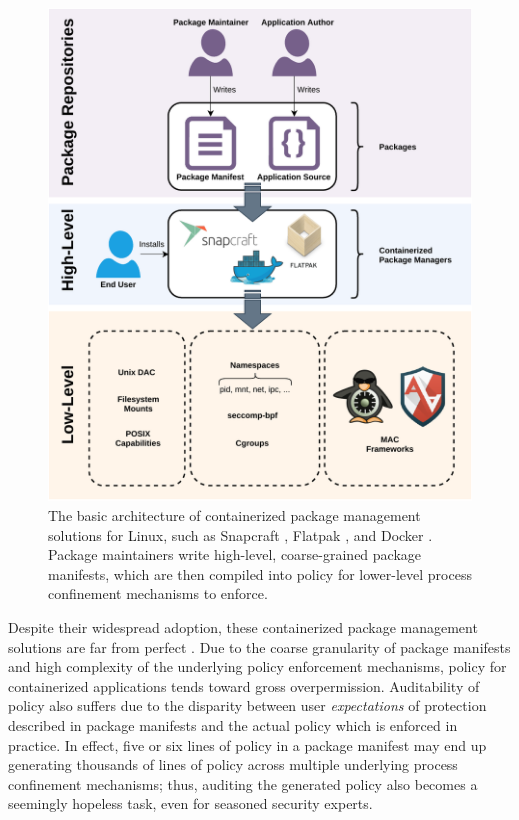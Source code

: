 \documentclass[dvipsnames, 12pt]{article}
\begin{document}
\begin{figure}[htpb]
    \centering
    \includegraphics[width=0.9\linewidth]{figs/high-level.pdf}
    \caption{
        The basic architecture of containerized package management solutions for
        Linux, such as Snapcraft \cite{snap}, Flatpak \cite{flatpak}, and Docker
        \cite{docker}. Package maintainers write high-level, coarse-grained
        package manifests, which are then compiled into policy for lower-level
        process confinement mechanisms to enforce.
    }%
    \label{fig:containerized}
\end{figure}

Despite their widespread adoption, these containerized package management
solutions are far from perfect \cite{sultan2019_container_security}. Due to the
coarse granularity of package manifests and high complexity of the underlying
policy enforcement mechanisms, policy for containerized applications tends
toward gross overpermission. Auditability of policy also suffers due to the
disparity between user \textit{expectations} of protection described in package
manifests and the actual policy which is enforced in practice. In effect, five
or six lines of policy in a package manifest may end up generating thousands of
lines of policy across multiple underlying process confinement mechanisms; thus,
auditing the generated policy also becomes a seemingly hopeless task, even for
seasoned security experts.
\end{document}
